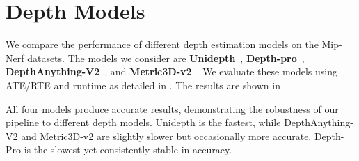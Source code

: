 
\section{Depth Models}
\label{app:depthcomparison}

We compare the performance of different depth estimation models on the Mip-Nerf datasets. The models we consider are \textbf{Unidepth}~\cite{piccinelli2024unidepth}, \textbf{Depth-pro}~\cite{bochkovskii2024depth}, \textbf{DepthAnything-V2}~\cite{yang24depthv2}, and \textbf{Metric3D-v2}~\cite{yin24metric3d}. We evaluate these models using ATE/RTE and runtime as detailed in . The results are shown in .

All four models produce accurate results, demonstrating the robustness of our \xmsfm pipeline to different depth models. Unidepth is the fastest, while DepthAnything-V2 and Metric3D-v2 are slightly slower but occasionally more accurate. Depth-Pro is the slowest yet consistently stable in accuracy.  


